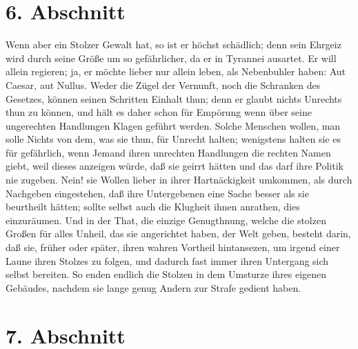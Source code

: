 \section{6. Abschnitt} \label{kap12_ab6}

Wenn aber ein Stolzer Gewalt hat, so ist er höchst schädlich; denn sein Ehrgeiz
wird durch seine Größe um so gefährlicher, da er in Tyrannei ausartet. Er will
allein regieren; ja, er möchte lieber nur allein leben, als Nebenbuhler haben:
Aut Caesar, aut Nullus. Weder die Zügel der Vernunft, noch die Schranken des
Gesetzes, können seinen Schritten Einhalt thun; denn er glaubt nichts Unrechts
thun zu können, und hält es daher schon für Empörung wenn über seine ungerechten
Handlungen Klagen geführt werden. Solche Menschen wollen, man solle Nichts von
dem, was sie thun, für Unrecht halten; wenigstens halten sie es für gefährlich,
wenn Jemand ihren unrechten Handlungen die rechten Namen giebt, weil dieses
anzeigen würde, daß sie geirrt hätten und das darf ihre Politik nie zugeben.
Nein! sie Wollen lieber in ihrer Hartnäckigkeit umkommen, als durch Nachgeben
eingestehen, daß ihre Untergebenen eine Sache besser als sie beurtheilt hätten;
sollte selbst auch die Klugheit ihnen anrathen, dies einzuräumen. Und in der
That, die einzige Genugthnung, welche die stolzen Großen für alles Unheil, das
sie angerichtet haben, der Welt geben, besteht darin, daß sie, früher oder
später, ihren wahren Vortheil hintansezen, um irgend einer Laune ihren Stolzes
zu folgen, und dadurch fast immer ihren Untergang sich selbst bereiten. So enden
endlich die Stolzen in dem Umsturze ihres eigenen Gebäudes, nachdem sie lange
genug Andern zur Strafe gedient haben.

\section{7. Abschnitt} \label{kap12_ab7}

